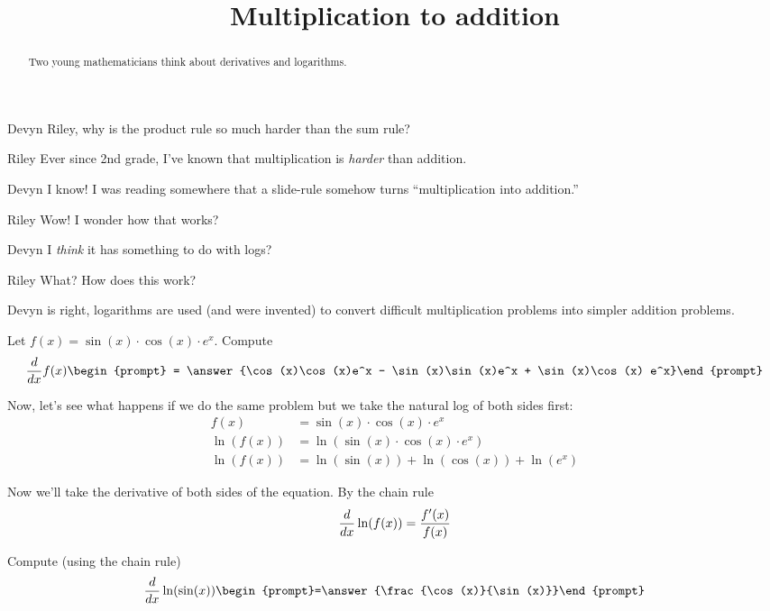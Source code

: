 \documentclass{ximera}
\title[Break-Ground:]{Multiplication to addition}
\begin{document}
\begin{abstract}
Two young mathematicians think about derivatives and logarithms.
\end{abstract}
\maketitle

\begin{dialogue}
\item[Devyn] Riley, why is the product rule so much harder than the sum rule?
\item[Riley] Ever since 2nd grade, I've known that multiplication is
  \textit{harder} than addition.
\item[Devyn] I know! I was reading somewhere that a slide-rule somehow
  turns ``multiplication into addition.''
\item[Riley] Wow! I wonder how that works?
\item[Devyn] I \textit{think} it has something to do with logs?
\item[Riley] What? How does this work?
\end{dialogue}

Devyn is right, logarithms are used (and were invented) to convert
difficult multiplication problems into simpler addition problems.

\begin{problem}
  Let $f(x) = \sin(x) \cdot \cos(x) \cdot e^x$. Compute
  \[
  \ddx f(x)\begin{prompt} = \answer{\cos(x)\cos(x)e^x - \sin(x)\sin(x)e^x + \sin(x)\cos(x) e^x}\end{prompt}
  \]
\end{problem}

Now, let's see what happens if we do the same problem but we take the
natural log of both sides first:
\begin{align*}
  f(x) &= \sin(x)\cdot\cos(x)\cdot e^x\\
  \ln(f(x)) &= \ln(\sin(x)\cdot\cos(x)\cdot e^x)\\
  \ln(f(x)) &=\ln(\sin(x)) + \ln(\cos(x)) + \ln(e^x)
\end{align*}

Now we'll take the derivative of both sides of the equation.
By the chain rule
\[
\frac{d}{dx} \ln(f(x))= \frac{f'(x)}{f(x)}
\]


\begin{problem}
  Compute (using the chain rule)
  \[
  \ddx \ln(\sin(x))  \begin{prompt}=\answer{\frac{\cos(x)}{\sin(x)}}\end{prompt}
  \]
\end{problem}
\end{document}
